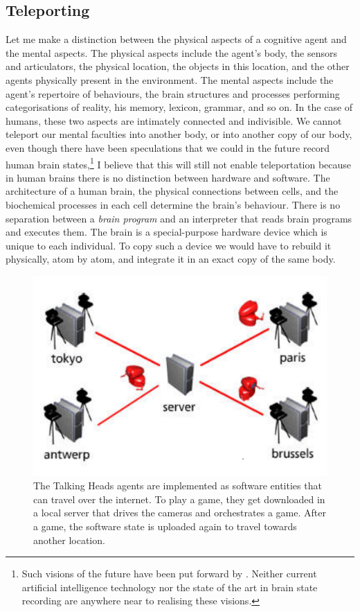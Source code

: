 \subsection{Teleporting}

Let me make a distinction between the physical aspects of 
a cognitive agent and the mental aspects. The physical aspects include the 
agent's body, the sensors and articulators, 
the physical location, the objects in this location, and the other
agents physically present in the environment. The 
mental aspects include the agent's repertoire of behaviours, 
the brain structures and processes
performing categorisations of reality, his
memory, lexicon, grammar, and so on. 
In the case of humans, these two aspects are intimately 
connected and indivisible. We cannot teleport our mental 
faculties into another body, or into another copy of 
our body, even though there have been speculations that 
we could in the future record human 
brain states,\footnote{
Such visions of the future have been put forward
by \cite{Moravec:1995}. Neither current artificial intelligence technology nor
the state of the art in brain state recording are anywhere 
near to realising these visions.}
I believe that this will still not enable teleportation
because in human brains there is no distinction between 
hardware and software. The architecture of a human brain, 
the physical connections between cells, and the 
biochemical processes in each cell determine the brain's behaviour.
There is no separation between a {\it brain program} and
an interpreter that reads brain programs and 
executes them. The brain is a special-purpose 
hardware device which is unique to each individual. 
To copy such a device we would have to rebuild it physically,
atom by atom, and integrate it in an exact copy of the 
same body. 


\begin{figure}[htbp]
  \centerline{\includegraphics[width=.50\textwidth]{chap1/figs/teleportation.pdf}}
\caption{The Talking Heads agents are implemented as software entities that can travel over the internet. 
To play a game, they get downloaded in a local server that drives the cameras and orchestrates a game. After a game, the software 
state is uploaded again to travel towards another location.}
\label{f:teleport}
\end{figure}

